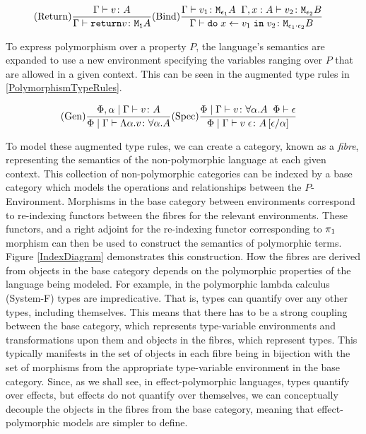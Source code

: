 \documentclass{Report}
\begin{document}

\begin{eqnarray}\label{GradedMonadTypeRules}
    (\text{Return}) \frac{\Gamma \vdash v \colon A}{\Gamma \vdash \texttt{return} v \colon \texttt{M}_{\texttt{1}}{A}} & (\text{Bind}) \frac{\Gamma \vdash v_1 \colon \texttt{M}_{\epsilon_1}{A} \;\; \Gamma, x: A \vdash v_2 \colon \texttt{M}_{\epsilon_2}{B}}{\Gamma \vdash \texttt{do}\; x \leftarrow v_1 \;\texttt{in}\; v_2 \colon \texttt{M}_{\epsilon_1 \cdot \epsilon_2}{B}}
\end{eqnarray}


To express polymorphism over a property $P$, the language's semantics are expanded to use a new environment specifying the variables ranging over $P$ that are allowed in a given context. This can be seen in the augmented type rules in \ref{PolymorphismTypeRules}.

\begin{eqnarray}\label{PolymorphismTypeRules}
    (\text{Gen}) \frac{\Phi, \alpha\mid\Gamma \vdash v \colon A}{\Phi\mid\Gamma \vdash \Lambda \alpha. v \colon \forall \alpha. A}& (\text{Spec}) \frac{\Phi\mid\Gamma \vdash v \colon \forall \alpha. A\;\;\Phi\vdash \epsilon}{\Phi\mid\Gamma \vdash v\;\epsilon \colon A\left[\epsilon / \alpha\right]}
\end{eqnarray}

To model these augmented type rules, we can create a category, known as a \textit{fibre}, representing the semantics  of the non-polymorphic language at each given context. This collection of non-polymorphic categories can be indexed by a base category which models the operations and relationships between the $P$-Environment. Morphisms in the base category between environments correspond to re-indexing functors between the fibres for the relevant environments. These functors, and a right adjoint for the re-indexing functor corresponding to $\pi_1$ morphism can then be used to construct the semantics of polymorphic terms. Figure \ref{IndexDiagram} demonstrates this construction. How the fibres are derived from objects in the base category depends on the polymorphic properties of the language being modeled. For example, in the polymorphic lambda calculus (System-F) types are impredicative. That is, types can quantify over any other types, including themselves. This means that there has to be a strong coupling between the base category, which represents type-variable environments and transformations upon them and objects in the fibres, which represent types. This typically manifests in the set of objects  in each fibre being in bijection with the set of morphisms from the appropriate type-variable environment in the base category. Since, as we shall see, in effect-polymorphic languages, types quantify over effects, but effects do not quantify over themselves, we can conceptually decouple the objects in the fibres from the base category, meaning that effect-polymorphic models are simpler to define. 
\end{document}
